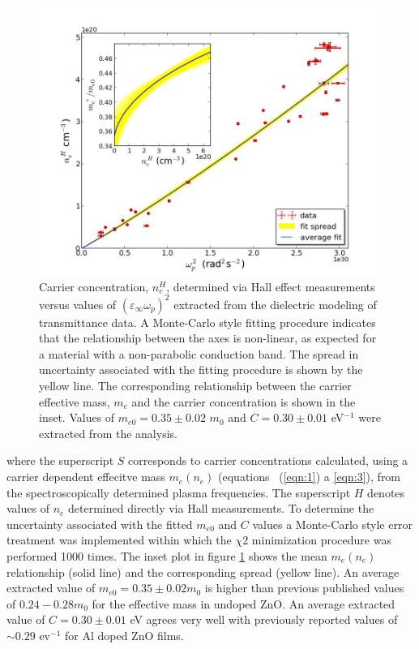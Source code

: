 \documentclass[final,5p,times]{elsarticle}
\begin{document}
\begin{figure}[th!]
\centering
\includegraphics[width = 1.0\columnwidth]{figure1c}
\caption{\label{fig:3} Carrier concentration, $n_e^H$, determined via Hall effect measurements versus values of $(\varepsilon_{\infty}\omega_p)^2$ extracted from the dielectric modeling of transmittance data. A Monte-Carlo style fitting procedure \cite{Mendelsberg2009, Anders2012} indicates that the relationship between the axes is non-linear, as expected for a material with a non-parabolic conduction band. The spread in uncertainty associated with the fitting procedure is shown by the yellow line. The corresponding relationship between the carrier effective mass, $m_e$ and the carrier concentration is shown in the inset. Values of $m_{e0}=0.35 \pm 0.02$ $m_{0}$ and $C = 0.30 \pm 0.01$ eV$^{-1}$ were extracted from the analysis.}
\end{figure}
where the superscript $S$ corresponds to carrier concentrations calculated, using a carrier dependent effecitve mass $m_e(n_e)$ (equations ~(\ref{eqn:1}) a \ref{eqn:3}), from the spectroscopically determined plasma frequencies. The superscript $H$ denotes values of $n_e$ determined directly via Hall measurements. To determine the uncertainty associated with the fitted $m_{e0}$ and $C$ values a Monte-Carlo style error treatment \cite{Mendelsberg2009} was implemented within which the $\chi2$ minimization procedure was performed 1000 times. The inset plot in figure \ref{fig:3} shows the mean $m_e(n_e)$ relationship (solid line) and the corresponding spread (yellow line). An average extracted value of $m_{e0} = 0.35\pm0.02m_0$ is higher than previous published values of $0.24 - 0.28 m_0$ for the effective mass in undoped ZnO. An average extracted value of $C=0.30\pm0.01$ eV agrees very well with previously reported values of $\sim0.29$ ev$^{-1}$ \cite{Ruske2009, Ellmer2001} for Al doped ZnO films.
\end{document}
